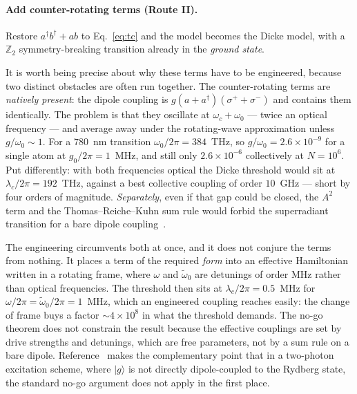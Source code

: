 \documentclass[11pt,a4paper]{article}
\newcommand{\dg}{^{\dagger}}
\newcommand{\wt}{\tilde{\omega}_{0}}
\newcommand{\lc}{\lambda_{c}}
\newcommand{\ket}[1]{\lvert #1 \rangle}
\begin{document}
\paragraph{Add counter-rotating terms (Route II).} Restore $a\dg b\dg + ab$ to
Eq.~\eqref{eq:tc} and the model becomes the Dicke model, with a $\mathbb{Z}_2$
symmetry-breaking transition already in the \emph{ground state}.

It is worth being precise about why these terms have to be engineered, because two distinct
obstacles are often run together. The counter-rotating terms are \emph{natively present}: the
dipole coupling is $g(a+a\dg)(\sigma^++\sigma^-)$ and contains them identically. The problem
is that they oscillate at $\omega_c+\omega_0$ --- twice an optical frequency --- and average
away under the rotating-wave approximation unless $g/\omega_0\sim1$. For a $780$~nm transition
$\omega_0/2\pi=384$~THz, so $g/\omega_0=2.6\times10^{-9}$ for a single atom at
$g_0/2\pi=1$~MHz, and still only $2.6\times10^{-6}$ collectively at $N=10^6$. Put
differently: with both frequencies optical the Dicke threshold would sit at
$\lc/2\pi=192$~THz, against a best collective coupling of order $10$~GHz --- short by four
orders of magnitude. \emph{Separately}, even if that gap could be closed, the $A^2$ term and
the Thomas--Reiche--Kuhn sum rule would forbid the superradiant transition for a bare dipole
coupling~\cite{Rzazewski1975,Nataf2010}.

The engineering circumvents both at once, and it does not conjure the terms from nothing. It
places a term of the required \emph{form} into an effective Hamiltonian written in a rotating
frame, where $\omega$ and $\wt$ are detunings of order MHz rather than optical frequencies.
The threshold then sits at $\lc/2\pi=0.5$~MHz for $\omega/2\pi=\wt/2\pi=1$~MHz, which an
engineered coupling reaches easily: the change of frame buys a factor $\sim\!4\times10^{8}$ in
what the threshold demands. The no-go theorem does not constrain the result because the
effective couplings are set by drive strengths and detunings, which are free parameters, not
by a sum rule on a bare dipole. Reference~\cite{Zhang2013} makes the complementary point that
in a two-photon excitation scheme, where $\ket{g}$ is not directly dipole-coupled to the
Rydberg state, the standard no-go argument does not apply in the first place.
\end{document}
